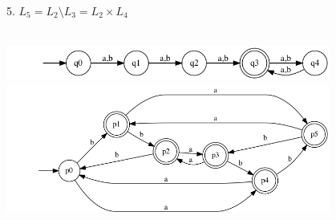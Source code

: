 \documentclass{article}
\begin{document}
\begin{enumerate}
5. $L_5 = L_2 \setminus L_3 = L_2 \times L_4 $ \\ \\
    \begin{center}
        \includegraphics[width=0.8\textwidth]{g251.png}
        \includegraphics[width=0.8\textwidth]{g252.png}
    \end{center}
    

\end{enumerate}
\end{document}
